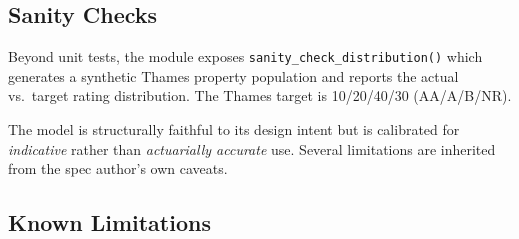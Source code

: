 \documentclass[11pt,a4paper]{article}
\begin{document}
\subsection{Sanity Checks}
Beyond unit tests, the module exposes \texttt{sanity\_check\_distribution()} which
generates a synthetic Thames property population and reports the actual vs.\ target
rating distribution. The Thames target is 10/20/40/30 (AA/A/B/NR).

\mkmtestresults

\mkmsensitivity



\mkmlimitations

The model is structurally faithful to its design intent but is calibrated for
\emph{indicative} rather than \emph{actuarially accurate} use. Several limitations
are inherited from the spec author's own caveats.

\subsection{Known Limitations}
\end{document}
